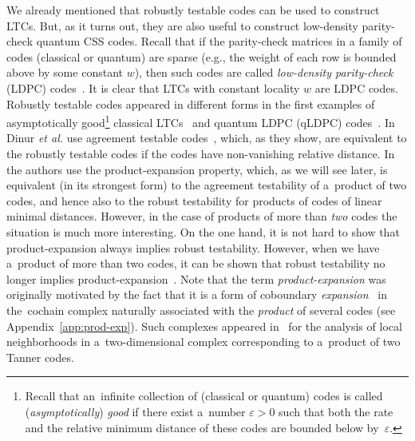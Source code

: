 \documentclass[11pt]{article}
\newcommand{\eps}{\varepsilon}
\theoremstyle{plain}
\theoremstyle{definition}
\theoremstyle{remark}
\begin{document}
We already mentioned that robustly testable codes can be used to construct LTCs. But, as it turns out, they are also useful to construct  low-density parity-check quantum CSS codes. Recall that if the parity-check matrices in a family of codes (classical or quantum) are sparse (e.g., the weight of each row is bounded above by some constant $w$), then such codes are called \emph{low-density parity-check} (LDPC) codes~\cite{gallager1963, Mackay:2004}.
It is clear that LTCs with constant locality $w$ are LDPC codes.  
Robustly testable codes appeared in different forms in the first examples of asymptotically good\footnote{Recall that an~infinite collection of (classical or quantum) codes  is called (\emph{asymptotically}) \emph{good} if there exist a~number $\eps>0$ such that both the rate and the relative minimum distance of these codes are bounded below by~$\eps$.} classical LTCs~\cite{Dinur:stoc2022, Panteleev&Kalachev:stoc2022} and quantum LDPC (qLDPC) codes~\cite{Panteleev&Kalachev:stoc2022}. In~\cite{Dinur:stoc2022} Dinur \emph{et al.} use agreement testable codes~\cite{Dinur:2017}, which, as they show, are equivalent to the robustly testable codes if the codes have non-vanishing relative distance. In~\cite{Panteleev&Kalachev:stoc2022} the authors use the product-expansion property, which, as we will see later, is equivalent (in its strongest form) to the agreement testability of a~product of two codes, and hence also to the robust testability for products of codes of linear minimal distances. However, in the case of products of more than \emph{two} codes the situation is much more interesting. On the one hand, it is not hard to show that product-expansion always implies  robust testability. However, when we have a~product of more than two codes, it can be shown that robust testability no longer implies product-expansion~\cite{Kalachev:2023}. Note that the term \emph{product-expansion} was originally motivated by the fact that it is a form of coboundary \emph{expansion}~\cite{Linial:2006,Gromov:2010} in the~cochain complex naturally associated with the \emph{product} of several codes (see Appendix~\ref{app:prod-exp}).  Such complexes appeared in~\cite{Panteleev&Kalachev:stoc2022} for the analysis of local neighborhoods in a~two-dimensional complex corresponding to a~product of two Tanner codes. 

 
\end{document}
